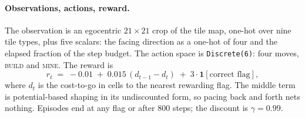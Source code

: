 \paragraph{Observations, actions, reward.}
The observation is an egocentric $21\times21$ crop of the tile map, one-hot
over nine tile types, plus five scalars: the facing direction as a one-hot of
four and the elapsed fraction of the step budget. The action space is
\texttt{Discrete(6)}: four moves, \textsc{build} and \textsc{mine}. The reward
is
\begin{equation}
r_t \;=\; -0.01 \;+\; 0.015\,(d_{t-1}-d_t) \;+\; 3\cdot\mathbf{1}[\text{correct flag}],
\label{eq:reward}
\end{equation}
where $d_t$ is the cost-to-go in cells to the nearest rewarding flag. The
middle term is potential-based shaping \citep{ng1999shaping} in its
undiscounted form, so pacing back and forth nets nothing. Episodes end at any
flag or after $800$ steps; the discount is $\gamma=0.99$.

